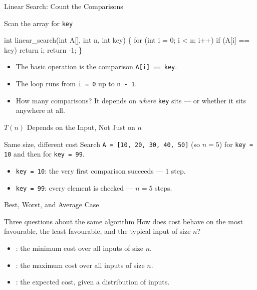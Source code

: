 \documentclass[aspectratio=169]{beamer}
\begin{document}
\begin{frame}[fragile]{Linear Search: Count the Comparisons}
  \begin{block}{Scan the array for \texttt{key}}
\begin{semiverbatim}
int linear_search(int A[], int n, int key) \{
    for (int i = 0; i < n; i++)
        if (A[i] == key)
            return i;
    return -1;
\}
\end{semiverbatim}
  \end{block}
  \begin{itemize}
    \item The basic operation is the comparison \texttt{A[i] == key}.
    \item The loop runs from \texttt{i = 0} up to \texttt{n - 1}.
    \item How many comparisons? It depends on \emph{where} \texttt{key} sits ---
      or whether it sits anywhere at all.
  \end{itemize}
\end{frame}

\begin{frame}{$T(n)$ Depends on the Input, Not Just on $n$}
  \begin{block}{Same size, different cost}
    Search \texttt{A = [10, 20, 30, 40, 50]} (so $n = 5$) for \texttt{key = 10}
    and then for \texttt{key = 99}.
  \end{block}
  \begin{itemize}
    \item \texttt{key = 10}: the very first comparison succeeds --- $1$ step.
    \item \texttt{key = 99}: every element is checked --- $n = 5$ steps.
  \end{itemize}
  \vspace{0.15cm}
\end{frame}

\begin{frame}{Best, Worst, and Average Case}
  \begin{block}{Three questions about the same algorithm}
    How does cost behave on the most favourable, the least favourable, and the
    typical input of size $n$?
    \cite{Karumanchi2017_data_structures_algorithms_made_easy}
  \end{block}
  \begin{itemize}
    \item {}: the minimum cost over all inputs of size $n$.
    \item {}: the maximum cost over all inputs of size $n$.
    \item {}: the expected cost, given a distribution of inputs.
  \end{itemize}
  \vspace{0.15cm}
\end{frame}
\end{document}
